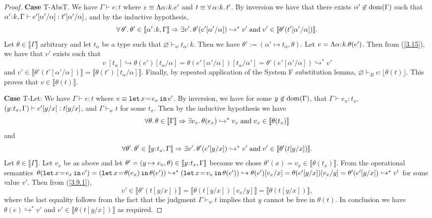 \documentclass[11pt]{article}
\newcommand{\al}{\alpha}
\newcommand{\bind}{\hspace{0.05em}{:}\hspace{0.05em}} %
\newcommand{\lb}{\llbracket}         %
\newcommand{\rb}{\rrbracket}         %
\newcommand{\step}{\hookrightarrow}
\newcommand{\many}{\hookrightarrow^*}
\newcommand{\polytype}[3]{\forall\, #1\bind #2.\, #3}
\newcommand{\foralltheta}{\forall\theta.\,\theta\in\lb\Gamma\rb}
\newcommand{\letin}[3]{{\tt let}\,#1\hspace{0.1em}{=}\hspace{0.1em}#2\,{\tt in}\,#3}
\newcommand{\dom}[1]{{\rm dom}(#1)}
\begin{document}
\begin{proof}
{\bf Case} {\sc T-AbsT}. We have $\Gamma \vdash e : t$ where $e \equiv \Lambda \al\bind k. e'$ and $t \equiv \polytype{\al}{k}{t'}$. By inversion we have that there exists $\al' \not\in\dom{\Gamma}$ such that $\al'\bind k, \Gamma \vdash e'[\al'/\al] : t'[\al'/\al]$, and by the inductive hypothesis,
\begin{equation}\label{3.15}
\forall\, \theta'.\, \theta' \in \lb\al'\bind k, \Gamma\rb \Rightarrow
\exists v'.\, \theta'(e'[\al'/\al]) \many v' \;{\rm and}\; v' \in \lb\theta'(t'[\al'/\al])\rb.
\end{equation}
Let $\theta \in \lb\Gamma\rb$ arbitrary and let $t_\al$ be a type such that $\varnothing \vdash_w t_\al : k$. Then we have $\theta' := (\al' \mapsto t_\al, \theta).$ 
Let $v = \Lambda\al\bind k.\theta(e')$.
Then from (\ref{3.15}), we have that $v'$ exists such that
\[
v\; [t_\al] \step \theta(e')[t_\al/\al] = \theta(e'[\al'/\al])[t_\al/\al'] = \theta'(e'[\al'/\al]) \many v'
\]
and $v' \in \lb\theta'(t'[\al'/\al])\rb = \lb\theta(t')[t_\al/\al]\rb.$
Finally, by repeated application of the System F substitution lemma, $\varnothing \vdash_B c : \lfloor \theta(t)\rfloor$. This proves that $v \in \lb \theta(t)\rb$.

{\bf Case} {\sc T-Let}: We have $\Gamma \vdash e : t$ where
$e \equiv \letin{x}{e_x}{e'}$.
By inversion, we have for some $y\not\in\dom{\Gamma}$, that
$\Gamma \vdash e_x : t_x$,\; $(y\bind t_x,\Gamma) \vdash e'[y/x] : t[y/x]$, and $\Gamma \vdash_w t$
for some $t_x$. Then by the inductive hypothesis we have
\[
\foralltheta \Rightarrow \exists v_x.\, \theta(e_x) \many v_x \;{\rm and}\; v_x \in \lb\theta(t_x)\rb
\] and 
\begin{equation}\label{3.9.1}
\forall\theta'.\, \theta' \in \lb y\bind t_x, \Gamma\rb \Rightarrow \exists v'.\, \theta'(e'[y/x]) \many v' \;{\rm and}\; v' \in \lb\theta'(t[y/x])\rb.
\end{equation}
Let $\theta \in \lb\Gamma\rb$. Let $v_x$ be as above and let $\theta' = (y\mapsto v_x, \theta)\in \lb y\bind t_x,\Gamma\rb$ because we chose $\theta'(x) = v_x \in \lb\theta(t_x)\rb$. 
From the operational semantics $\theta(\letin{x}{e_x}{e'}) = (\letin{x}{\theta(e_x)}{\theta(e')}) \many (\letin{x}{v_x}{\theta(e')}) \step \theta(e')[v_x/x] = \theta(e'[y/x])[v_x/y] = \theta'(e'[y/x]) \many v'$ for some value $v'$.
 Then from (\ref{3.9.1}),
\[
v' \in \lb\theta'(t[y/x])\rb = \lb\theta(t[y/x])[v_x/y]\rb = \lb\theta(t[y/x])\rb,
\]
where the last equality follows from the fact that the judgment $\Gamma \vdash_w t$ implies that $y$ cannot be free in $\theta(t)$.
In conclusion we have $\theta(e) \many v'$ and $v' \in \lb\theta(t[y/x])\rb$ as required.


\end{proof}
\end{document}
